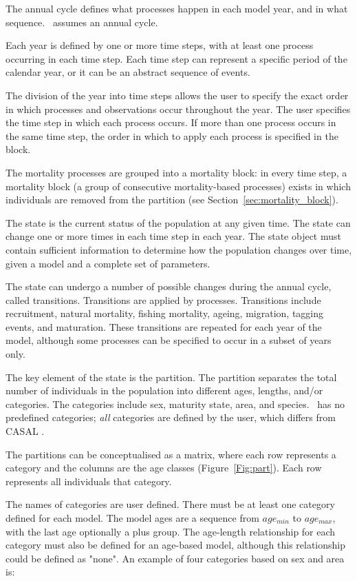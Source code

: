 The annual cycle defines what processes happen in each model year, and in what sequence. \CNAME\ assumes an annual cycle.

Each year is defined by one or more time steps, with at least one process occurring in each time step. Each time step can represent a specific period of the calendar year, or it can be an abstract sequence of events.

The division of the year into time steps allows the user to specify the exact order in which processes and observations occur throughout the year. The user specifies the time step in which each process occurs. If more than one process occurs in the same time step, the order in which to apply each process is specified in the  block.

The mortality processes are grouped into a mortality block: in every time step, a mortality block (a group of consecutive mortality-based processes) exists in which individuals are removed from the partition (see Section~\ref{sec:mortality_block}).

The state is the current status of the population at any given time. The state can change one or more times in each time step in each year. The state object must contain sufficient information to determine how the population changes over time, given a model and a complete set of parameters.

The state can undergo a number of possible changes during the annual cycle, called transitions. Transitions are applied by processes. Transitions include recruitment, natural mortality, fishing mortality, ageing, migration, tagging events, and maturation. These transitions are repeated for each year of the model, although some processes can be specified to occur in a subset of years only.

The key element of the state is the partition. The partition separates the total number of individuals in the population into different ages, lengths, and/or categories. The categories include sex, maturity state, area, and species. \CNAME\ has no predefined categories; \emph{all} categories are defined by the user, which differs from CASAL \citep{1388}.

The partitions can be conceptualised as a matrix, where each row represents a category and the columns are the age classes (Figure~\ref{Fig:part}). Each row represents all individuals that category.

The names of categories are user defined. There must be at least one category defined for each model. The model ages are a sequence from $age_{min}$ to $age_{max}$, with the last age optionally a plus group. The age-length relationship for each category must also be defined for an age-based model, although this relationship could be defined as "none". An example of four categories based on sex and area is:

